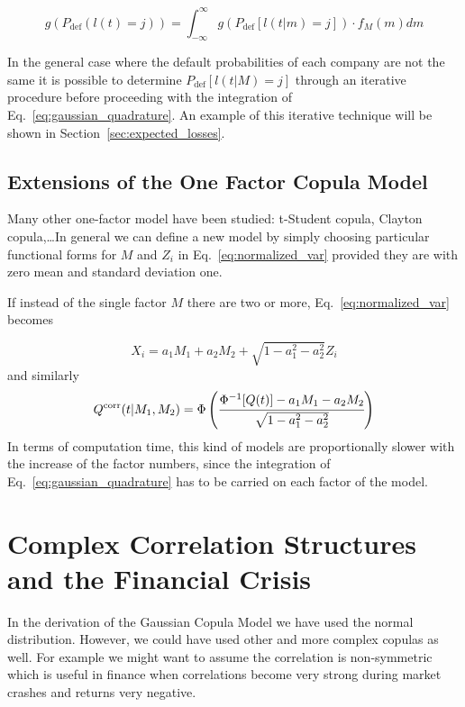 \begin{equation}
g(P_{\mathrm{def}}(l(t) = j)) = \int_{-\infty}^{\infty}{g(P_{\mathrm{def}}[l(t|m) = j])\cdot f_M(m)dm}
\label{eq:gaussian_quadrature}
\end{equation}

In the general case where the default probabilities of each company are not the same it is possible to determine $P_{\mathrm{def}}[l(t|M)=j]$ through an iterative procedure before proceeding with the integration of Eq.~\ref{eq:gaussian_quadrature}. An example of this iterative technique will be shown in Section~\ref{sec:expected_losses}.

\subsection{Extensions of the One Factor Copula Model}
Many other one-factor model have been studied: t-Student copula, Clayton copula,\ldots In general we can define a new model by simply choosing particular functional forms for $M$ and $Z_i$ in Eq.~\ref{eq:normalized_var} provided they are with zero mean and standard deviation one. 

If instead of the single factor $M$ there are two or more, Eq.~\ref{eq:normalized_var} becomes

\begin{equation}
X_i = a_1 M_1 + a_2 M_2 + \sqrt{1 - a_1^2 - a^2_2}Z_i
\end{equation}
and similarly
\begin{equation}
Q^{\textrm{corr}}(t|M_1, M_2) = \Phi\left(\cfrac{\Phi^{-1}[Q(t)]-a_1 M_1 - a_2 M_2}{\sqrt{1 - a_1^2 - a^2_2}}\right)
\end{equation}
In terms of computation time, this kind of models are proportionally slower with the increase of the factor numbers, since the integration of Eq.~\ref{eq:gaussian_quadrature} has to be carried on each factor of the model.

\section{Complex Correlation Structures and the Financial Crisis}
\label{complex-correlation-structures-and-the-financial-crisis}

In the derivation of the Gaussian Copula Model we have used the normal distribution. However, we could have used other and more complex copulas as well. For example we might want to assume the correlation is non-symmetric which is useful in finance when correlations become very strong during market crashes and returns very negative.

